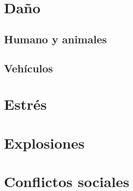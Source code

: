 \section{Daño}

\subsection{Humano y animales}

\subsection{Vehículos}

\section{Estrés}

\section{Explosiones}

\section{Conflictos sociales}

